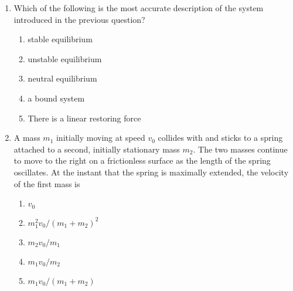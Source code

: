 \documentclass{../../oss-apphys}
\begin{document}
\begin{multicols}{2}
\begin{enumerate}[resume,leftmargin=18pt]
  \item Which of the following is the most accurate description of the system
    introduced in the previous question?
    \begin{enumerate}[noitemsep,topsep=0pt,leftmargin=18pt,label=(\Alph*)]
    \item stable equilibrium
    \item unstable equilibrium
    \item neutral equilibrium
    \item a bound system
    \item There is a linear restoring force
    \end{enumerate}
    
  \item A mass $m_1$ initially moving at speed $v_0$ collides with and sticks
    to a spring attached to a second, initially stationary mass $m_2$. The two
    masses continue to move to the right on a frictionless surface as the
    length of the spring oscillates. At the instant that the spring is
    maximally extended, the velocity of the first mass is
    \begin{center}
    \end{center}
    \begin{enumerate}[noitemsep,topsep=0pt,leftmargin=18pt,label=(\Alph*)]
    \item $v_0$
    \item $m_1^2v_0/(m_1+m_2)^2$
    \item $m_2v_0/m_1$
    \item $m_1v_0/m_2$
    \item $m_1v_0/(m_1+m_2)$
    \end{enumerate}
    \columnbreak
    

\end{enumerate}
\end{multicols}
\end{document}
